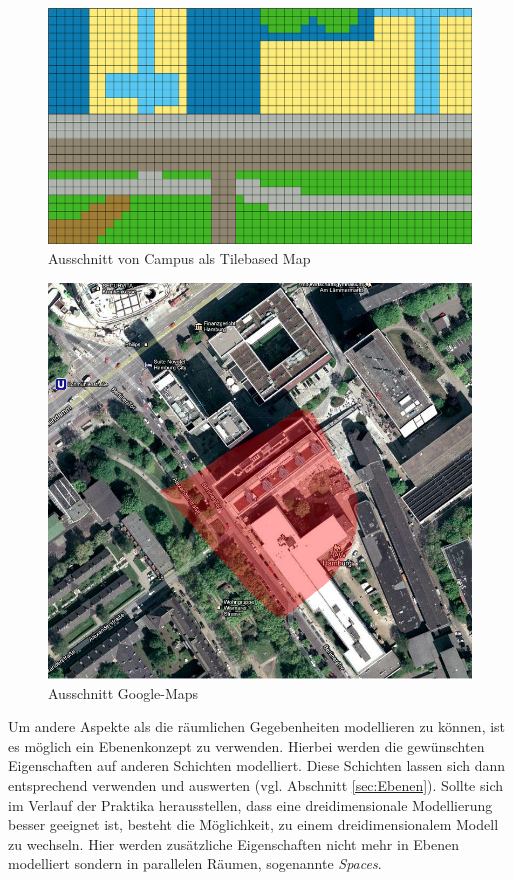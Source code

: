 \documentclass[10pt]{scrartcl}
\begin{document}
      \begin{figure}[htbp]
        \centering
                \includegraphics[scale=0.5]{img/tile_map_campus_pic}
        \caption{Ausschnitt von Campus als \glqq Tilebased Map\grqq{}}
        \label{img:tile_map}
        \end{figure}  
        
        
      \begin{figure}[htbp]
        \centering
                \includegraphics[scale=0.5]{img/google_maps}
        \caption{Ausschnitt Google-Maps}
        \label{img:google_maps}
        \end{figure}  
        
        
        Um andere Aspekte als die räumlichen Gegebenheiten modellieren zu können, ist es möglich ein Ebenenkonzept zu verwenden. Hierbei werden die gewünschten Eigenschaften auf anderen Schichten modelliert. Diese Schichten lassen sich dann entsprechend verwenden und auswerten (vgl. Abschnitt \ref{sec:Ebenen}).
Sollte sich im Verlauf der Praktika herausstellen, dass eine dreidimensionale Modellierung besser geeignet ist, besteht die Möglichkeit, zu einem dreidimensionalem Modell zu wechseln. Hier werden zusätzliche Eigenschaften nicht mehr in Ebenen modelliert sondern in parallelen Räumen, sogenannte \textit{Spaces}.
\end{document}
